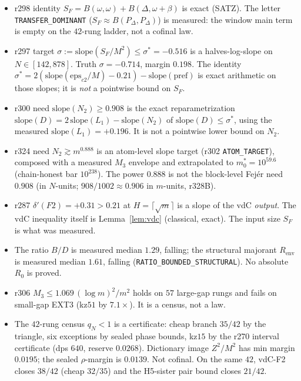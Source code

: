 \documentclass[11pt]{article}
\theoremstyle{remark}
\newcommand{\pref}{\mathrm{pref}}
\begin{document}
\begin{itemize}
\item r298 identity $S_F=B(\omega,\omega)+B(\Delta,\omega+\beta)$
is exact (SATZ).  The letter \texttt{TRANSFER\_DOMINANT}
($S_F\approx B(P_\Delta,P_\Delta)$) is measured: the window main
term is empty on the $42$-rung ladder, not a cofinal law.
\item r297 target $\sigma:=\mathrm{slope}(S_F/M^2)\le\sigma^*=-0.516$
is a halves-log-slope on $N\in[142,878]$.  Truth $\sigma=-0.714$,
margin $0.198$.  The identity
$\sigma^*=2(\mathrm{slope}(\mathrm{eps}_{c2}/M)-0.21)-\mathrm{slope}(\pref)$
is exact arithmetic on those slopes; it is \emph{not} a
pointwise bound on $S_F$.
\item r300 need $\mathrm{slope}(N_2)\ge 0.908$ is the exact
reparametrization $\mathrm{slope}(D)=2\,\mathrm{slope}(L_1)-\mathrm{slope}(N_2)$
of $\mathrm{slope}(D)\le\sigma^*$, using the measured
$\mathrm{slope}(L_1)=+0.196$.  It is not a pointwise lower
bound on $N_2$.
\item r324 need $N_2\gtrsim m^{0.888}$ is an atom-level slope
target (r302 \texttt{ATOM\_TARGET}), composed with a measured
$M_3$ envelope and extrapolated to $m_0^*=10^{59.6}$ (chain-honest
bar $10^{238}$).  The power $0.888$ is not the block-level
Fej\'er need $0.908$ (in $N$-units; $908/1002\approx 0.906$ in
$m$-units, r328B).
\item r287 $\delta'(F2)=+0.31>0.21$ at $H=\lceil\sqrt{m}\rceil$
is a slope of the vdC \emph{output}.  The vdC inequality itself
is Lemma~\ref{lem:vdc} (classical, exact).  The input size
$S_F$ is what was measured.
\item The ratio $B/D$ is measured median $1.29$, falling; the
structural majorant $R_{\mathrm{env}}$ is measured median
$1.61$, falling (\texttt{RATIO\_BOUNDED\_STRUCTURAL}).  No
absolute $R_0$ is proved.
\item r306 $M_3\le 1.069\,(\log m)^2/m^2$ holds on $57$ large-gap
rungs and fails on small-gap EXT3 (kz$51$ by $7.1\times$).  It
is a census, not a law.
\item The $42$-rung census $q_N<1$ is a certificate: cheap
branch $35/42$ by the triangle, six exceptions by sealed phase
bounds, kz$15$ by the r270 interval certificate (dps $640$,
reserve $0.0268$).  Dictionary image $Z^2/M^2$ has min margin
$0.0195$; the sealed $\rho$-margin is $0.0139$.  Not cofinal.
On the same $42$, vdC-F2 closes $38/42$ (cheap $32/35$) and
the H5-sister pair bound closes $21/42$.
\end{itemize}
\end{document}
